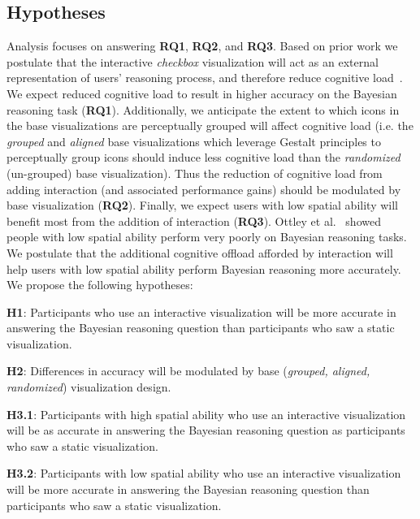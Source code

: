 \subsection{Hypotheses}
Analysis focuses on answering \textbf{RQ1}, \textbf{RQ2}, and \textbf{RQ3}.
Based on prior work we postulate that the interactive \textit{checkbox} visualization will act as an external representation of users' reasoning process, and therefore reduce cognitive load~\cite{liu2010Mental, pohl2012User}. We expect reduced cognitive load to result in higher accuracy on the Bayesian reasoning task (\textbf{RQ1}). Additionally, we anticipate the extent to which icons in the base visualizations are perceptually grouped will affect cognitive load (i.e. the \textit{grouped} and \textit{aligned} base visualizations which leverage Gestalt principles to perceptually group icons should induce less cognitive load than the \textit{randomized} (un-grouped) base visualization). Thus the reduction of cognitive load from adding interaction (and associated performance gains) should be modulated by base visualization (\textbf{RQ2}). Finally, we expect users with low spatial ability will benefit most from the addition of interaction (\textbf{RQ3}). Ottley et al.~\cite{ottley2016Bayesian} showed people with low spatial ability perform very poorly on Bayesian reasoning tasks. We postulate that the additional cognitive offload afforded by interaction will help users with low spatial ability perform Bayesian reasoning more accurately. We propose the following hypotheses:

\begin{compacthang} 
	\item \textbf{H1}: Participants who use an interactive visualization will be more accurate in answering the Bayesian reasoning question than participants who saw a static visualization. 
	\item \textbf{H2}: Differences in accuracy will be modulated by base (\textit{grouped, aligned, randomized}) visualization design. 
	\item \textbf{H3.1}: Participants with high spatial ability who use an interactive visualization will be as accurate in answering the Bayesian reasoning question as participants who saw a static visualization. 
	\item \textbf{H3.2}: Participants with low spatial ability who use an interactive visualization will be more accurate in answering the Bayesian reasoning question than participants who saw a static visualization. 
\end{compacthang}

